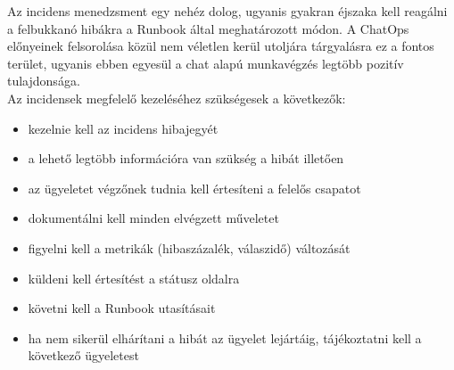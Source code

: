 Az incidens menedzsment egy nehéz dolog, ugyanis gyakran éjszaka kell reagálni a felbukkanó hibákra a Runbook által meghatározott módon. A ChatOps előnyeinek felsorolása közül nem véletlen kerül utoljára tárgyalásra ez a fontos terület, ugyanis ebben egyesül a chat alapú munkavégzés legtöbb pozitív tulajdonsága.\\
Az incidensek megfelelő kezeléséhez szükségesek a következők:
\begin{itemize}
  \item kezelnie kell az incidens hibajegyét
  \item a lehető legtöbb információra van szükség a hibát illetően
  \item az ügyeletet végzőnek tudnia kell értesíteni a felelős csapatot
  \item dokumentálni kell minden elvégzett műveletet
  \item figyelni kell a metrikák (hibaszázalék, válaszidő) változását
  \item küldeni kell értesítést a státusz oldalra
  \item követni kell a Runbook utasításait
  \item ha nem sikerül elhárítani a hibát az ügyelet lejártáig, tájékoztatni kell a következő ügyeletest
\end{itemize}
\hfill\\
